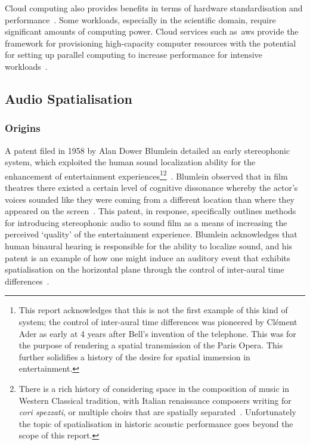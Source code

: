 Cloud computing also provides benefits in terms of hardware standardisation and performance~\citep{rehr_scientific}.
Some workloads, especially in the scientific domain, require significant amounts of computing power.
Cloud services such as~\gls{aws} provide the framework
for provisioning high-capacity computer resources with the potential
for setting up parallel computing to increase performance for intensive workloads~\citep{rehr_scientific}.

\subsection{Audio Spatialisation}\label{subsec:audio-spatialisation}
\subsubsection{Origins}

A patent filed in 1958 by Alan Dower Blumlein detailed an early stereophonic system, which exploited the human sound localization ability for the enhancement of entertainment experiences\footnote{This report acknowledges that this is not the first example of this kind of system; the control of inter-aural time differences was pioneered by Cl\'ement Ader as early at 4 years after Bell's invention of the telephone. This was for the purpose of rendering a spatial transmission of the Paris Opera. This further solidifies a history of the desire for spatial immersion in entertainment.}\footnote{There is a rich history of considering space in the composition of music in Western Classical tradition, with Italian renaissance composers writing for \textit{cori spezzati}, or multiple choirs that are spatially separated~\citep{spezzati}. Unfortunately the topic of spatialisation in historic acoustic performance goes beyond the scope of this report.}~\citep{blumlein-patent}.
Blumlein observed that in film theatres there existed a certain level of cognitive dissonance whereby the actor’s voices sounded like they were coming from a different location than where they appeared on the screen~\citep{alexander_blumlein}.
This patent, in response,
specifically outlines methods for introducing stereophonic audio to sound film as a means
of increasing the perceived `quality' of the entertainment experience.
Blumlein acknowledges that human binaural hearing is responsible for the ability to localize sound, and his patent is an example of how one might induce an auditory event that exhibits spatialisation on the horizontal plane through the control of inter-aural time differences~\citep{blumlein-patent}.

